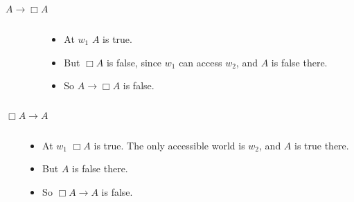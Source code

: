 \documentclass[
  14pt,
  letterpaper,
  ignorenonframetext,
  aspectratio=169,
]{beamer}
\begin{document}
\begin{frame}{\(A \rightarrow \Box A\)}
\protect\hypertarget{a-rightarrow-box-a}{}
\begin{columns}
    \begin{column}{0.45\textwidth}
    \end{column}
    \begin{column}{0.5\textwidth}
    \begin{itemize}
    \item At $w_1$ $A$ is true.
    \item But $\Box A$ is false, since $w_1$ can access $w_2$, and $A$ is false there.
    \item So $A \rightarrow \Box A$ is false.
    \end{itemize}
  \end{column}
\end{columns}
\end{frame}

\begin{frame}{\(\Box A \rightarrow A\)}
\protect\hypertarget{box-a-rightarrow-a}{}
\begin{columns}
    \begin{column}{0.45\textwidth}
    \end{column}
    \begin{column}{0.5\textwidth}
    \begin{itemize}
    \item At $w_1$ $\Box A$ is true. The only accessible world is $w_2$, and $A$ is true there.
    \item But $A$ is false there.
    \item So $\Box A \rightarrow A$ is false.
    \end{itemize}
  \end{column}
\end{columns}
\end{frame}
\end{document}
